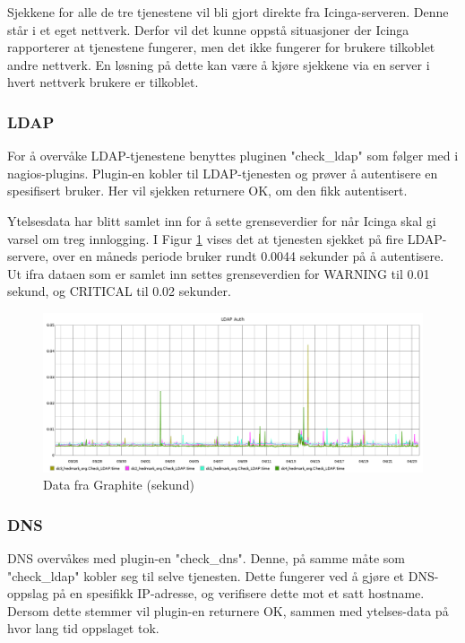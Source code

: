 Sjekkene for alle de tre tjenestene vil bli gjort direkte fra Icinga-serveren. Denne står i et eget nettverk. Derfor vil det kunne oppstå situasjoner der Icinga rapporterer at tjenestene fungerer, men det ikke fungerer for brukere tilkoblet andre nettverk. En løsning på dette kan være å kjøre sjekkene via en server i hvert nettverk brukere er tilkoblet.

\subsubsection*{LDAP}
For å overvåke LDAP-tjenestene benyttes pluginen "check\_ldap" som følger med i nagios-plugins. Plugin-en kobler til LDAP-tjenesten og prøver å autentisere en spesifisert bruker. Her vil sjekken returnere OK, om den fikk autentisert. 

Ytelsesdata har blitt samlet inn for å sette grenseverdier for når Icinga skal gi varsel om treg innlogging. I Figur \ref{ldapauth-inv} vises det at tjenesten sjekket på fire LDAP-servere, over en måneds periode bruker rundt 0.0044 sekunder på å autentisere. Ut ifra dataen som er samlet inn settes grenseverdien for WARNING til 0.01 sekund, og CRITICAL til 0.02 sekunder.

\begin{figure}[H]
    \centering
    \includegraphics[width=1.0\textwidth]{img/ldap-auth-inv}
    \caption{Data fra Graphite (sekund)}
    \label{ldapauth-inv}
\end{figure}

\subsubsection*{DNS}

DNS overvåkes med plugin-en "check\_dns". Denne, på samme måte som "check\_ldap" kobler seg til selve tjenesten. Dette fungerer ved å gjøre et DNS-oppslag på en spesifikk IP-adresse, og verifisere dette mot et satt hostname. Dersom dette stemmer vil plugin-en returnere OK, sammen med ytelses-data på hvor lang tid oppslaget tok.

